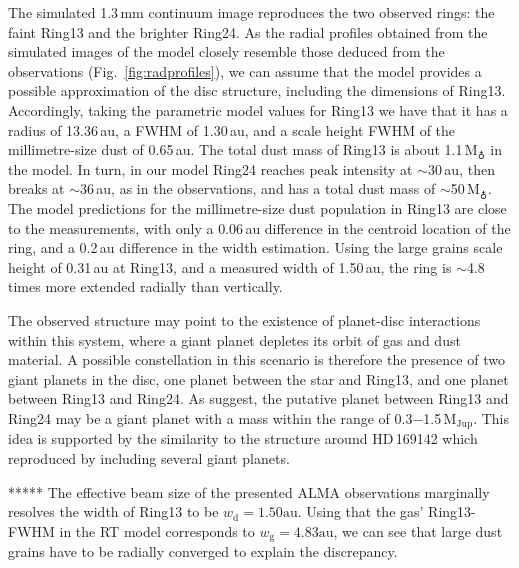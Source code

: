 \documentclass[letters,usenatbib,times]{mnras}
\begin{document}
The simulated 1.3\,mm continuum image reproduces the two observed rings: the faint Ring13 and the brighter Ring24. As the radial profiles obtained from the simulated images of the model closely resemble those deduced from the observations (Fig.~\ref{fig:radprofiles}), we can assume that the model provides a possible approximation of the disc structure, including the dimensions of Ring13. Accordingly, taking the parametric model values for Ring13 we have that it has a radius of 13.36\,au, a FWHM of 1.30\,au, and a scale height FWHM of the millimetre-size dust of 0.65\,au. The total dust mass of Ring13 is about 1.1\,M$_{\earth}$ in the model. In turn, in our model Ring24 reaches peak intensity at $\sim$30\,au, then breaks at $\sim$36\,au, as in the observations, and has a total dust mass of $\sim$50\,M$_{\earth}$. The model predictions for the millimetre-size dust population in Ring13 are close to the measurements, with only a 0.06\,au difference in the centroid location of the ring, and a 0.2\,au difference in the width estimation. Using the large grains scale height of 0.31\,au at Ring13, and a measured width of 1.50\,au, the ring is $\sim$4.8 times more extended  radially than vertically.

The observed structure may point to the existence of planet-disc interactions within this system, where a giant planet depletes its orbit of gas and dust material. A possible  constellation in this scenario is therefore the presence of two giant planets in the disc, one planet between the star and Ring13, and one planet between Ring13 and Ring24. As \citet{Ru_z_Rodr_guez_2019} suggest, the putative planet between Ring13 and Ring24 may be a giant planet with a mass within the range of 0.3$-$1.5\,$\mathrm{M}_{\mathrm{Jup}}$. This idea is supported by the similarity to the structure around HD\,169142 which \citet{2020arXiv200711565B} reproduced by including several giant planets. 

*****
The effective beam size of the presented ALMA observations marginally resolves the width of Ring13 to be $w_\mathrm{d} = 1.50\mathrm{au}$. %
Using that the gas' Ring13-FWHM in the RT model corresponds to $w_\mathrm{g} = 4.83\mathrm{au}$, we can see that large dust grains have to be radially converged to explain the discrepancy.
\end{document}
